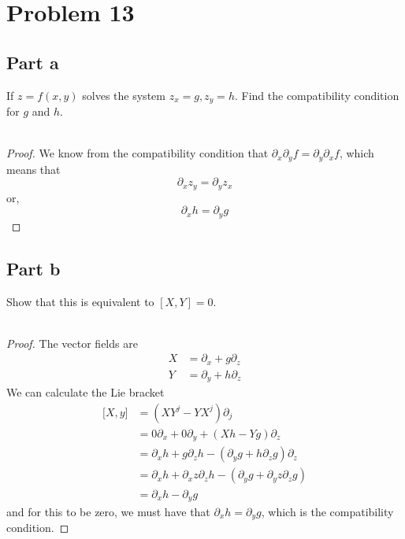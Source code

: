 \documentclass[fontsize=11pt]{scrartcl} %
\numberwithin{equation}{section} %
\numberwithin{figure}{section} %
\numberwithin{table}{section} %
\begin{document}
\section*{Problem 13}
\subsection*{Part a}
If $z = f(x,y)$ solves the system $z_x = g, z_y=h$. Find the compatibility
condition for $g$ and $h$.
\\
\\
\begin{proof}
    We know from the compatibility condition that $\partial_x\partial_y f =
    \partial_y\partial_x f$, which means that
    \[
        \partial_x z_y = \partial_y z_x
    \]
    or,
    \[
        \partial_x h = \partial_y g
    \]
\end{proof}

\subsection*{Part b}
Show that this is equivalent to $[X,Y] = 0$.
\\
\\
\begin{proof}
    The vector fields are
    \[
        \begin{aligned}
            X &= \partial_x + g\partial_z\\
            Y &= \partial_y + h\partial_z
        \end{aligned}
    \]
    We can calculate the Lie bracket
    \[
        \begin{aligned}
            {[}X,y{]} &= (XY^j-YX^j)\partial_j\\
                    &= 0\partial_x + 0\partial_y + (Xh-Yg)\partial_z\\
                    &= \partial_xh + g\partial_zh - (\partial_yg +
                    h\partial_zg)\partial_z\\
                    &=\partial_xh+\partial_xz\partial_zh -
                    (\partial_yg+\partial_yz\partial_zg)\\
                    &=\partial_xh - \partial_yg
        \end{aligned}
    \]
    and for this to be zero, we must have that $\partial_xh=\partial_yg$, which
    is the compatibility condition.
\end{proof}
\end{document}
